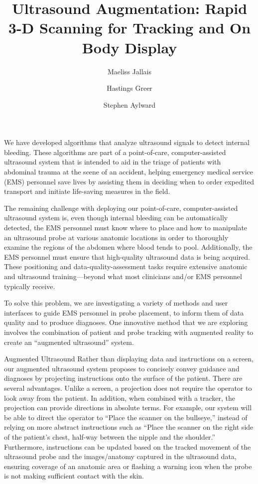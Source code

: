 \documentclass{llncs}
\begin{document}
%
\frontmatter
%
\pagestyle{headings}
\title{Ultrasound Augmentation: Rapid 3-D Scanning for Tracking and On Body Display}
\author{Maeliss Jallais \and Hastings Greer \and Stephen Aylward}
%
\mainmatter
\maketitle

We have developed algorithms that analyze ultrasound signals to detect internal bleeding.  These algorithms are part of a point-of-care, computer-assisted ultrasound system that is intended to aid in the triage of patients with abdominal trauma at the scene of an accident, helping emergency medical service (EMS) personnel save lives by assisting them in deciding when to order expedited transport and initiate life-saving measures in the field.

The remaining challenge with deploying our point-of-care, computer-assisted ultrasound system is, even though internal bleeding can be automatically detected, the EMS personnel must know where to place and how to manipulate an ultrasound probe at various anatomic locations in order to thoroughly examine the regions of the abdomen where blood tends to pool. Additionally, the EMS personnel must ensure that high-quality ultrasound data is being acquired. These positioning and data-quality-assessment tasks require extensive anatomic and ultrasound training—beyond what most clinicians and/or EMS personnel typically receive.

To solve this problem, we are investigating a variety of methods and user interfaces to guide EMS personnel in probe placement, to inform them of data quality and to produce diagnoses. One innovative method that we are exploring involves the combination of  patient and probe tracking with augmented reality to create an “augmented ultrasound” system.

Augmented Ultrasound
Rather than displaying data and instructions on a screen, our augmented ultrasound system proposes to concisely convey guidance and diagnoses by projecting instructions onto the surface of the patient. There are several advantages. Unlike a screen, a projection does not require the operator to look away from the patient. In addition, when combined with a tracker, the projection can provide directions in absolute terms. For example, our system will be able to direct the operator to “Place the scanner on the bullseye,” instead of relying on more abstract instructions such as “Place the scanner on the right side of the patient’s chest, half-way between the nipple and the shoulder.” Furthermore, instructions can be updated based on the tracked movement of the ultrasound probe and the images/anatomy captured in the ultrasound data, ensuring coverage of an anatomic area or flashing a warning icon when the probe is not making sufficient contact with the skin.
\end{document}
